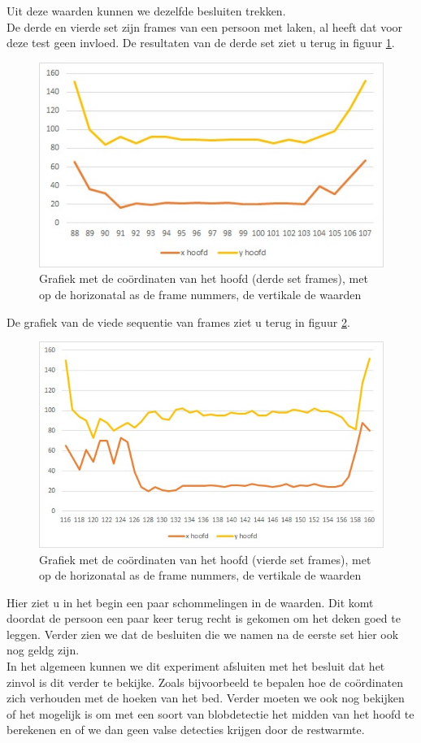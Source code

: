   Uit deze waarden kunnen we dezelfde besluiten trekken. \\
  De derde en vierde set zijn frames van een persoon met laken, al heeft dat voor deze test geen invloed. De resultaten van de derde set ziet u terug in figuur \ref{imgCHM}. \\
   \begin{figure}[hbp]
   	\includegraphics[scale = 0.75]{Grafiek_UitBedM}
   	\caption{Grafiek met de co\"ordinaten van het hoofd (derde set frames), met op de horizonatal as de frame nummers, de vertikale de waarden}
   	\label{imgCHM}
   \end{figure}
   De grafiek van de viede sequentie van frames ziet u terug in figuur \ref{imgCHMT}.
   \begin{figure}[hbp]
   	\includegraphics[scale = 0.75]{Grafiek_UitBedMT}
   	\caption{Grafiek met de co\"ordinaten van het hoofd (vierde set frames), met op de horizonatal as de frame nummers, de vertikale de waarden}
   	\label{imgCHMT}
   \end{figure}
   Hier ziet u in het begin een paar schommelingen in de waarden. Dit komt doordat de persoon een paar keer terug recht is gekomen om het deken goed te leggen. Verder zien we dat de besluiten die we namen na de eerste set hier ook nog geldg zijn.\\
   In het algemeen kunnen we dit experiment afsluiten met het besluit dat het zinvol is dit verder te bekijke. Zoals bijvoorbeeld te bepalen hoe de co\"ordinaten zich verhouden met de hoeken van het bed. Verder moeten we ook nog bekijken of het mogelijk is om met een soort van blobdetectie het midden van het hoofd te berekenen en of we dan geen valse detecties krijgen door de restwarmte.

